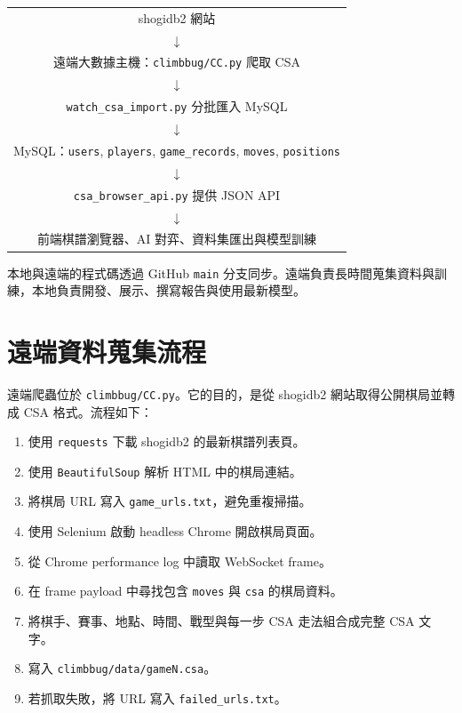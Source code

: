 \documentclass[12pt,a4paper,fontset=none]{ctexart}
\begin{document}
\begin{center}
\begin{tabular}{c}
shogidb2 網站 \\
$\downarrow$ \\
遠端大數據主機：\texttt{climbbug/CC.py} 爬取 CSA \\
$\downarrow$ \\
\texttt{watch\_csa\_import.py} 分批匯入 MySQL \\
$\downarrow$ \\
MySQL：\texttt{users}, \texttt{players}, \texttt{game\_records}, \texttt{moves}, \texttt{positions} \\
$\downarrow$ \\
\texttt{csa\_browser\_api.py} 提供 JSON API \\
$\downarrow$ \\
前端棋譜瀏覽器、AI 對弈、資料集匯出與模型訓練
\end{tabular}
\end{center}

本地與遠端的程式碼透過 GitHub \texttt{main} 分支同步。遠端負責長時間蒐集資料與訓練，本地負責開發、展示、撰寫報告與使用最新模型。

\section{遠端資料蒐集流程}

遠端爬蟲位於 \texttt{climbbug/CC.py}。它的目的，是從 shogidb2 網站取得公開棋局並轉成 CSA 格式。流程如下：

\begin{enumerate}
  \item 使用 \texttt{requests} 下載 shogidb2 的最新棋譜列表頁。
  \item 使用 \texttt{BeautifulSoup} 解析 HTML 中的棋局連結。
  \item 將棋局 URL 寫入 \texttt{game\_urls.txt}，避免重複掃描。
  \item 使用 Selenium 啟動 headless Chrome 開啟棋局頁面。
  \item 從 Chrome performance log 中讀取 WebSocket frame。
  \item 在 frame payload 中尋找包含 \texttt{moves} 與 \texttt{csa} 的棋局資料。
  \item 將棋手、賽事、地點、時間、戰型與每一步 CSA 走法組合成完整 CSA 文字。
  \item 寫入 \texttt{climbbug/data/gameN.csa}。
  \item 若抓取失敗，將 URL 寫入 \texttt{failed\_urls.txt}。
\end{enumerate}
\end{document}
